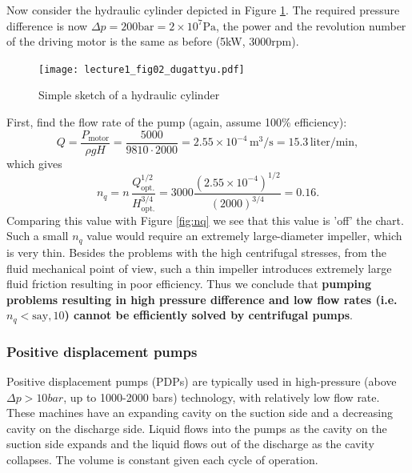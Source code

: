 
\vspace{0.5cm}

 Now consider the hydraulic cylinder depicted in Figure \ref{fig:hydraulic_cylinder}. The required pressure difference is now $\Delta p=200 \mathrm{bar} = 2\times 10^7 \mathrm{Pa}$, the power and the revolution number of the driving motor is the same as before (5kW, 3000rpm).

\begin{figure}[tbh]
\begin{center}
\texttt{[image: lecture1\_fig02\_dugattyu.pdf]}
\caption{\label{fig:hydraulic_cylinder}Simple sketch of a hydraulic cylinder}
\end{center}
\end{figure}

\noindent First, find the flow rate of the pump (again, assume 100\% efficiency):
%
\begin{equation}
Q=\frac{P_{\mathrm{motor}}}{\rho gH}=\frac{5000}{9810\cdot 2000}=2.55\times 10^{-4}\,\mathrm{m^3/s}=15.3\,\mathrm{liter/min},
\end{equation}
%
which gives
%
\begin{equation}
n_q=n\,\frac{Q^{1/2}_{\mathrm{opt.}}}{H^{3/4}_{\mathrm{opt.}}}=3000\frac{\left(2.55\times 10^{-4}\right)^{1/2}}{\left(2000\right)^{3/4}}= 0.16.
\end{equation}
%
\noindent Comparing this value with Figure \ref{fig:nq} we see that this value is 'off' the chart. Such a small $n_q$ value would require an extremely large-diameter impeller, which is very thin. Besides the problems with the high centrifugal stresses, from the fluid mechanical point of view, such a thin impeller introduces extremely large fluid friction resulting in poor efficiency. Thus we conclude that {\bf pumping problems resulting in high pressure difference and low flow rates (i.e. $n_q< \mathrm{say,} 10$) cannot be efficiently solved by centrifugal pumps}.


\subsubsection{Positive displacement pumps}

Positive displacement pumps (PDPs) are typically used in high-pressure (above $\Delta p > 10 bar$, up to 1000-2000 bars) technology, with relatively low flow rate. These machines have an expanding cavity on the suction side and a decreasing cavity on the discharge side. Liquid flows into the pumps as the cavity on the suction side expands and the liquid flows out of the discharge as the cavity collapses. The volume is constant given each cycle of operation.

